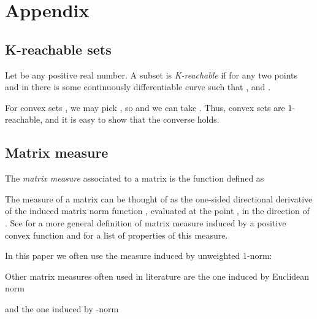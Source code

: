 \documentclass[letterpaper, 10 pt, conference]{ieeeconf}
\begin{document}
\addtolength{\textheight}{-9.5cm}   









\section*{Appendix}
\subsection*{K-reachable sets}
Let  be any positive real number. A subset  is \emph{K-reachable} if for any two points  and  in  there is some continuously differentiable curve  such that ,  and .

For convex sets , we may pick , so  and we can take . Thus, convex sets are 1-reachable, and it is easy to show that the converse holds.


\subsection*{Matrix measure}
The \emph{matrix measure} \cite{vidyasagar2002nonlinear} associated to a matrix  is the function  defined as

The measure of a matrix  can be thought of as the one-sided directional derivative of the induced matrix norm function , evaluated at the point , in the direction of . See \cite{vidyasagar1978matrix} for a more general definition of matrix measure induced by a positive convex function and \cite{vidyasagar2002nonlinear,desoer1972measure} for a list of properties of this measure.

In this paper we often use the measure induced by unweighted 1-norm:

Other matrix measures often used in literature are the one induced by Euclidean norm
 
and the one induced by -norm

\vspace{0.1cm}








 
   
\end{document}
